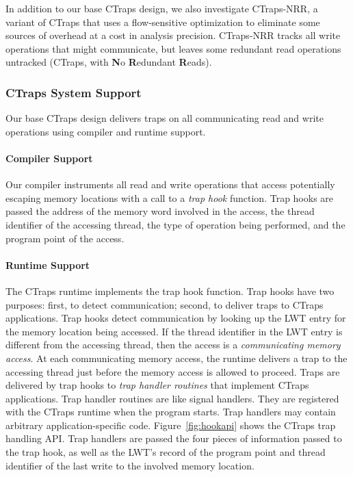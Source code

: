 \documentclass[preprint,9pt]{sigplanconf}
\newcommand{\ctraps}{CTraps\xspace}
\newcommand{\ctrapsmm}{CTraps-NRR\xspace}
\newcommand{\lwt}{LWT\xspace}
\begin{document}
In addition to our base \ctraps design, we also investigate \ctrapsmm, a
variant of \ctraps that uses a flow-sensitive optimization to eliminate some
sources of overhead at a cost in analysis precision. \ctrapsmm tracks all write
operations that might communicate, but leaves some redundant read operations
untracked (\ctraps, with {\bf N}o {\bf R}edundant {\bf R}eads).  

\subsubsection{\ctraps System Support} 

Our base \ctraps design delivers traps on all communicating read and write
operations using compiler and runtime support. 

\paragraph{Compiler Support}
Our compiler instruments all read and write operations that access potentially
escaping memory locations with a call to a {\em trap hook} function.  Trap hooks
are passed the address of the memory word involved in the access, the thread
identifier of the accessing thread, the type of operation being performed, and
the program point of the access.  

\paragraph{Runtime Support}
The \ctraps runtime implements the trap hook function.  Trap hooks have two
purposes: first, to detect communication; second, to deliver traps to \ctraps
applications.  Trap hooks detect communication by looking up the \lwt entry for
the memory location being accessed.  If the thread identifier in the \lwt entry is
different from the accessing thread, then the access is a {\em communicating
memory access}.  At each communicating memory access, the runtime delivers a
trap to the accessing thread just before the memory access is allowed to
proceed.  Traps are delivered by trap hooks to {\em trap handler routines} that
implement \ctraps applications.  Trap handler routines are like signal
handlers.  They are registered with the \ctraps runtime when the program
starts.  Trap handlers may contain arbitrary application-specific code.
Figure~\ref{fig:hookapi} shows the \ctraps trap handling API.  Trap
handlers are passed the four pieces of information passed to the trap hook, as
well as the \lwt's record of the program point and thread identifier of the
last write to the involved memory location.
\end{document}
